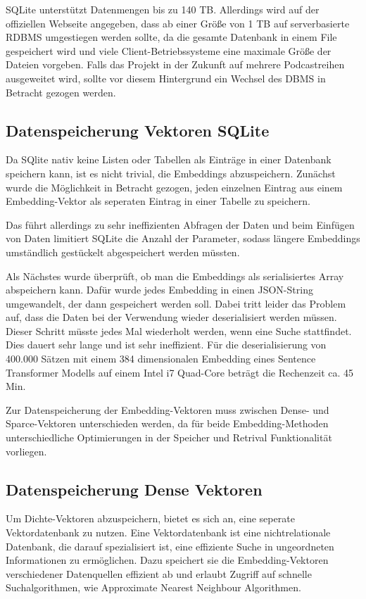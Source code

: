 SQLite unterstützt Datenmengen bis zu 140 TB. 
Allerdings wird auf der offiziellen Webseite angegeben, dass ab einer Größe von 1 TB auf serverbasierte RDBMS umgestiegen werden sollte, da die gesamte Datenbank in einem File gespeichert wird und viele Client-Betriebssysteme eine maximale Größe der Dateien vorgeben. 
Falls das Projekt in der Zukunft auf mehrere Podcastreihen ausgeweitet wird, sollte vor diesem Hintergrund ein Wechsel des DBMS in Betracht gezogen werden.

\subsection{Datenspeicherung Vektoren SQLite}

Da SQlite nativ keine Listen oder Tabellen als Einträge in einer Datenbank speichern kann, ist es nicht trivial, die Embeddings abzuspeichern.
Zunächst wurde die Möglichkeit in Betracht gezogen, jeden einzelnen Eintrag aus einem Embedding-Vektor als seperaten Eintrag in einer Tabelle zu speichern. 

Das führt allerdings zu sehr ineffizienten Abfragen der Daten und beim Einfügen von Daten limitiert SQLite die Anzahl der Parameter, sodass längere Embeddings umständlich gestückelt abgespeichert werden müssten.

Als Nächstes wurde überprüft, ob man die Embeddings als serialisiertes Array abspeichern kann.
Dafür wurde jedes Embedding in einen JSON-String umgewandelt, der dann gespeichert werden soll. 
Dabei tritt leider das Problem auf, dass die Daten bei der Verwendung wieder deserialisiert werden müssen.
Dieser Schritt müsste jedes Mal wiederholt werden, wenn eine Suche stattfindet. 
Dies dauert sehr lange und ist sehr ineffizient. 
Für die deserialisierung von 400.000 Sätzen mit einem 384 dimensionalen Embedding eines Sentence Transformer Modells auf einem Intel i7 Quad-Core beträgt die Rechenzeit ca. 45 Min.

Zur Datenspeicherung der Embedding-Vektoren muss zwischen Dense- und Sparce-Vektoren unterschieden werden, da für beide Embedding-Methoden unterschiedliche Optimierungen in der Speicher und Retrival Funktionalität vorliegen. 

\subsection{Datenspeicherung Dense Vektoren}

Um Dichte-Vektoren abzuspeichern, bietet es sich an, eine seperate Vektordatenbank zu nutzen.
Eine Vektordatenbank ist eine nichtrelationale Datenbank, die darauf spezialisiert ist, eine effiziente Suche in ungeordneten Informationen zu ermöglichen.
Dazu speichert sie die Embedding-Vektoren verschiedener Datenquellen effizient ab und erlaubt Zugriff auf schnelle Suchalgorithmen, wie Approximate Nearest Neighbour Algorithmen.

